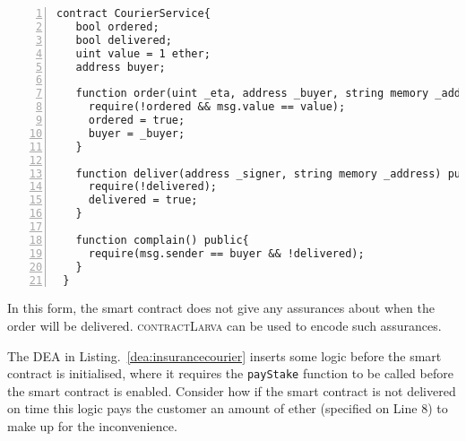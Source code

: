 \documentclass{article}
\newcommand{\contractlarva}{\textsc{contractLarva}\xspace}
\begin{document}
 
     \small\begin{lstlisting}[language=Solidity,basicstyle=\scriptsize,numbers=left,numbersep=2pt,xleftmargin=0.3cm,label={code:courierservice1}]
 contract CourierService{
   bool ordered;
   bool delivered;
   uint value = 1 ether;
   address buyer;
   
   function order(uint _eta, address _buyer, string memory _address) public{
     require(!ordered && msg.value == value);
     ordered = true;
     buyer = _buyer;
   }
   
   function deliver(address _signer, string memory _address) public{
     require(!delivered);
     delivered = true;
   }
 
   function complain() public{
     require(msg.sender == buyer && !delivered);
   }
 }
     \end{lstlisting}\normalsize
   
 In this form, the smart contract does not give any assurances about when the order will be delivered. \contractlarva can be used to encode such assurances.
 
 The DEA in Listing.~\ref{dea:insurancecourier} inserts some logic before the smart contract is initialised, where it requires the \texttt{payStake} function to be called before the smart contract is enabled. Consider how if the smart contract is not delivered on time this logic pays the customer an amount of ether (specified on Line 8) to make up for the inconvenience.
 
\end{document}
